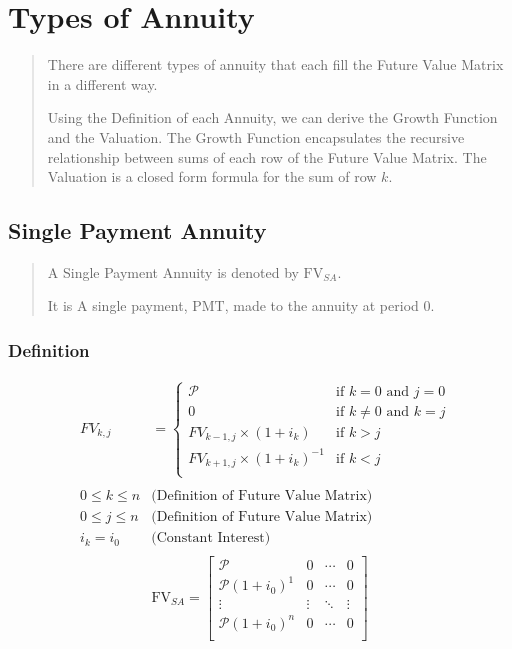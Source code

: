 \documentclass{article} %
\newcommand{\pmt}{\text{PMT}} %
\newcommand{\FV}{\mathrm{FV}} %
\newcommand{\p}{\mathcal{P}} %
\newcommand{\FVSA}{\FV_{S\!A}} %
\begin{document}
\section{Types of Annuity}
\begin{quote}
    There are different types of annuity that each fill the Future Value Matrix in a different way.

    Using the Definition of each Annuity, we can derive the Growth Function and the Valuation. The Growth Function encapsulates the recursive relationship between sums of each row of the Future Value Matrix. The Valuation is a closed form formula for the sum of row $k$.
\end{quote}

\subsection{Single Payment Annuity}
\begin{quote}
    A Single Payment Annuity is denoted by $\FVSA$.

    It is A single payment, $\pmt$, made to the annuity at period 0.
\end{quote}
\subsubsection{Definition}
\begin{align*}
     & FV_{k,j}        & =
    \begin{cases}
        \p                               & \text{if } k = 0 \text{ and } j = 0    \\
        0                                & \text{if } k \neq 0 \text{ and } k = j \\
        FV_{k-1,j} \times (1 + i_k)      & \text{if } k > j                       \\
        FV_{k+1,j} \times (1 + i_k)^{-1} & \text{if } k < j                       \\
    \end{cases} \\\\
     & 0 \leq k \leq n & \text{(Definition of Future Value Matrix)}           \\
     & 0 \leq j \leq n & \text{(Definition of Future Value Matrix)}           \\
     & i_k = i_0       & \text{(Constant Interest)}                           \\
\end{align*}
\[
    \FVSA =
    \begin{bmatrix}
        \p            & 0      & \cdots & 0      \\
        \p(1 + i_0)^1 & 0      & \cdots & 0      \\
        \vdots        & \vdots & \ddots & \vdots \\
        \p(1 + i_0)^n & 0      & \cdots & 0      \\
    \end{bmatrix}
\]
\end{document}
